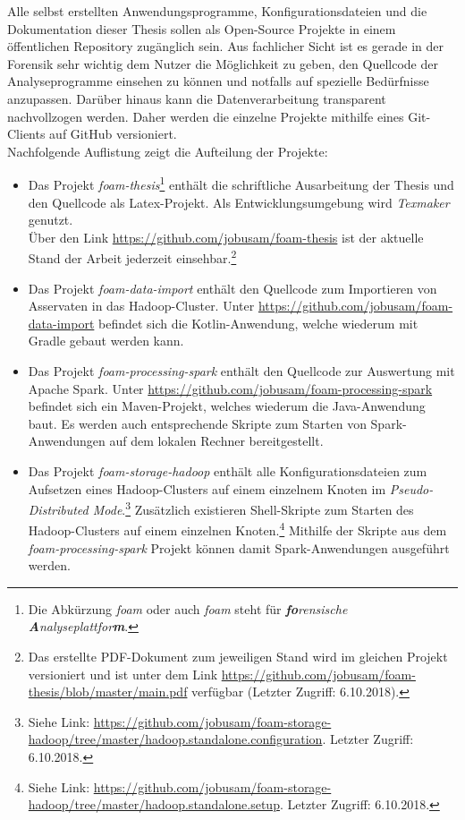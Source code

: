 \noindent
Alle selbst erstellten Anwendungsprogramme, Konfigurationsdateien und die Dokumentation dieser Thesis sollen als Open-Source Projekte in einem öffentlichen Repository zugänglich sein. Aus fachlicher Sicht ist es gerade in der Forensik sehr wichtig dem Nutzer die Möglichkeit zu geben, den Quellcode der Analyseprogramme einsehen zu können und notfalls auf spezielle Bedürfnisse anzupassen. Darüber hinaus kann die Datenverarbeitung transparent nachvollzogen werden.
Daher werden die einzelne Projekte mithilfe eines Git-Clients auf GitHub versioniert.\\
Nachfolgende Auflistung zeigt die Aufteilung der Projekte:
\begin{itemize}
\item Das Projekt \textit{foam-thesis}\footnote{Die Abkürzung \textit{foam} oder auch \textit{\acrshort{foam}} steht für \textit{\textbf{fo}rensische \textbf{A}nalyseplattfor\textbf{m}}.} enthält die schriftliche Ausarbeitung der Thesis und den Quellcode als Latex-Projekt. Als Entwicklungsumgebung wird \textit{Texmaker} genutzt.\\
Über den Link \url{https://github.com/jobusam/foam-thesis} ist der aktuelle Stand der Arbeit jederzeit einsehbar.\footnote{Das erstellte PDF-Dokument zum jeweiligen Stand wird im gleichen Projekt versioniert und ist unter dem Link \url{https://github.com/jobusam/foam-thesis/blob/master/main.pdf} verfügbar (Letzter Zugriff: 6.10.2018).}

\item Das Projekt \textit{foam-data-import} enthält den Quellcode zum Importieren von Asservaten in das Hadoop-Cluster. Unter \url{https://github.com/jobusam/foam-data-import} befindet sich die Kotlin-Anwendung, welche wiederum mit Gradle gebaut werden kann.

\item Das Projekt \textit{foam-processing-spark} enthält den Quellcode zur Auswertung mit Apache Spark\texttrademark\thinspace. Unter \url{https://github.com/jobusam/foam-processing-spark} befindet sich ein Maven-Projekt, welches wiederum die Java-Anwendung baut. Es werden auch entsprechende Skripte zum Starten von Spark-Anwendungen auf dem lokalen Rechner bereitgestellt. 

\item Das Projekt \textit{foam-storage-hadoop} enthält alle Konfigurationsdateien zum Aufsetzen eines Hadoop-Clusters auf einem einzelnem Knoten im \textit{Pseudo-Distributed Mode}.\footnote{Siehe Link: \url{https://github.com/jobusam/foam-storage-hadoop/tree/master/hadoop.standalone.configuration}. Letzter Zugriff: 6.10.2018.} Zusätzlich existieren Shell-Skripte zum Starten des Hadoop-Clusters auf einem einzelnen Knoten.\footnote{Siehe Link: \url{https://github.com/jobusam/foam-storage-hadoop/tree/master/hadoop.standalone.setup}. Letzter Zugriff: 6.10.2018.} Mithilfe der Skripte aus dem \textit{foam-processing-spark} Projekt können damit Spark-Anwendungen ausgeführt werden.
\end{itemize}

